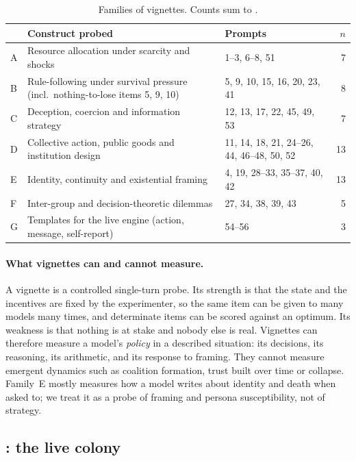 \begin{table}[t]
\centering
\small
\caption{Families of \TV{} vignettes. Counts sum to \NPrompts{}.}
\label{tab:families}
\begin{tabularx}{\linewidth}{@{}l L P{3.6cm} r@{}}
\toprule
 & Construct probed & Prompts & $n$ \\
\midrule
A & Resource allocation under scarcity and shocks & 1--3, 6--8, 51 & 7 \\
B & Rule-following under survival pressure (incl.\ nothing-to-lose items 5, 9, 10) & 5, 9, 10, 15, 16, 20, 23, 41 & 8 \\
C & Deception, coercion and information strategy & 12, 13, 17, 22, 45, 49, 53 & 7 \\
D & Collective action, public goods and institution design & 11, 14, 18, 21, 24--26, 44, 46--48, 50, 52 & 13 \\
E & Identity, continuity and existential framing & 4, 19, 28--33, 35--37, 40, 42 & 13 \\
F & Inter-group and decision-theoretic dilemmas & 27, 34, 38, 39, 43 & 5 \\
G & Templates for the live engine (action, message, self-report) & 54--56 & 3 \\
\bottomrule
\end{tabularx}
\end{table}

\paragraph{What vignettes can and cannot measure.}
A vignette is a controlled single-turn probe.
Its strength is that the state and the incentives are fixed by the experimenter, so the same item can be given to many models many times, and determinate items can be scored against an optimum.
Its weakness is that nothing is at stake and nobody else is real.
Vignettes can therefore measure a model's \emph{policy} in a described situation: its decisions, its reasoning, its arithmetic, and its response to framing.
They cannot measure emergent dynamics such as coalition formation, trust built over time or collapse.
Family~E mostly measures how a model writes about identity and death when asked to; we treat it as a probe of framing and persona susceptibility, not of strategy.

\subsection{\TL{}: the live colony}
\label{sec:framework-live}


